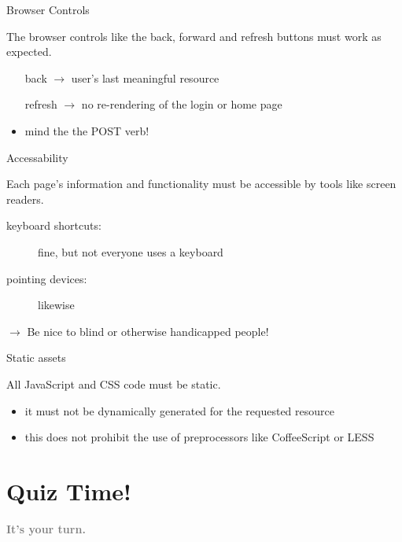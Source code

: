 \documentclass{beamer}
\begin{document}
\begin{frame}{Browser Controls}

  The browser controls like the back, forward and refresh buttons must work as expected.

  \begin{itemize}
    \item[back] \ensuremath{\rightarrow} user's last meaningful resource
    \item[refresh] \ensuremath{\rightarrow} no re-rendering of the login or home page
    \item mind the the POST verb!
  \end{itemize}
\end{frame}

\begin{frame}{Accessability}

  Each page's information and functionality must be accessible by tools like screen readers.

  \begin{description}
    \item[keyboard shortcuts:] fine, but not everyone uses a keyboard
    \item[pointing devices:] likewise
  \end{description}

  \ensuremath{\rightarrow} Be nice to blind or otherwise handicapped people!
\end{frame}

\begin{frame}{Static assets}

  All JavaScript and CSS code must be static.

  \begin{itemize}
    \item it must not be dynamically generated for the requested resource
    \item this does not prohibit the use of preprocessors like CoffeeScript or LESS
  \end{itemize}
\end{frame}

\section{Quiz Time!}

\begin{frame}
  \vspace*{-1cm}
  \textcolor{gray}{
    \begin{center}
      \textbf{
        \fontsize{50}{50}\selectfont It's your turn.
      }
    \end{center}
  }
\end{frame}
\end{document}
